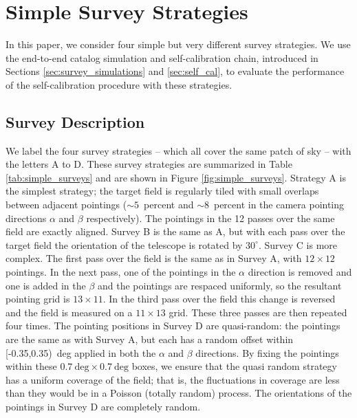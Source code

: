 \documentclass[preprint,pdftex]{aastex}
\begin{document}
\section{Simple Survey Strategies}
\label{sec:simple_surveys}
In this paper, we consider four simple but very different survey strategies. We use the end-to-end catalog simulation and self-calibration chain, introduced in Sections \ref{sec:survey_simulations} and \ref{sec:self_cal}, to evaluate the performance of the self-calibration procedure with these strategies. 

\subsection{Survey Description}
We label the four survey strategies -- which all cover the same patch of sky -- with the letters A to D. These survey strategies are summarized in Table \ref{tab:simple_surveys} and are shown in Figure \ref{fig:simple_surveys}. Strategy A is the simplest strategy; the target field is regularly tiled with small overlaps between adjacent pointings ($\sim 5$~percent and $\sim 8$~percent in the camera pointing directions $\alpha$ and $\beta$ respectively). The pointings in the 12 passes over the same field are exactly aligned. Survey B is the same as A, but with each pass over the target field the orientation of the telescope is rotated by $30^\circ$. Survey C is more complex. The first pass over the field is the same as in Survey A, with $12 \times 12$ pointings. In the next pass, one of the pointings in the $\alpha$ direction is removed and one is added in the $\beta$ and the pointings are respaced uniformly, so the resultant pointing grid is $13 \times 11$. In the third pass over the field this change is reversed and the field is measured on a $11 \times 13$ grid. These three passes are then repeated four times. The pointing positions in Survey D are quasi-random: the pointings are the same as with Survey A, but each has a random offset within [-0.35,0.35)~deg applied in both the $\alpha$ and $\beta$ directions. By fixing the pointings within these $0.7~\text{deg} \times 0.7~\text{deg}$ boxes, we ensure that the quasi random strategy has a uniform coverage of the field; that is, the fluctuations in coverage are less than they would be in a Poisson (totally random) process. The orientations of the pointings in Survey D are completely random.
\end{document}
